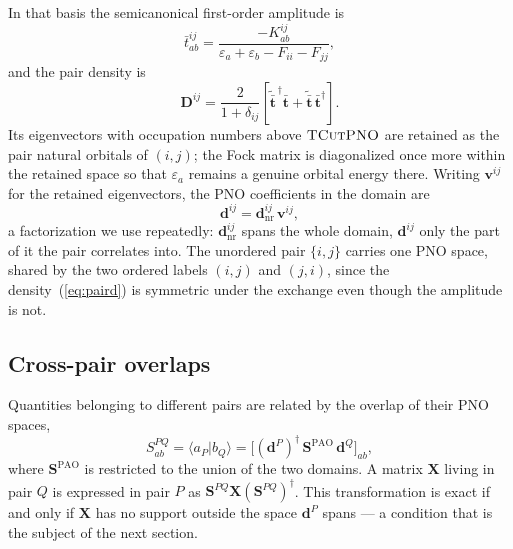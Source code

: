 \documentclass[aip,jcp,amsmath,amssymb,preprint,superscriptaddress]{revtex4-2}%
\newcommand{\TCut}[1]{\textsc{TCut#1}}
\begin{document}
In that basis the semicanonical first-order amplitude is
%
\begin{equation}
  \bar{t}^{ij}_{ab} = \frac{-K^{ij}_{ab}}
    {\varepsilon_a + \varepsilon_b - F_{ii} - F_{jj}},
  \label{eq:tsc}
\end{equation}
%
and the pair density is
%
\begin{equation}
  \mathbf{D}^{ij} = \frac{2}{1+\delta_{ij}}
    \left[ \tilde{\bar{\mathbf{t}}}^{\,\dagger}\bar{\mathbf{t}}
         + \tilde{\bar{\mathbf{t}}}\,\bar{\mathbf{t}}^{\dagger}\right].
  \label{eq:paird}
\end{equation}
%
Its eigenvectors with occupation numbers above $\TCut{PNO}$ are retained as
the pair natural orbitals of $(i,j)$; the Fock matrix is diagonalized once more
within the retained space so that $\varepsilon_a$ remains a genuine orbital
energy there. Writing $\mathbf{v}^{ij}$ for the retained eigenvectors, the PNO
coefficients in the domain are
%
\begin{equation}
  \mathbf{d}^{ij} = \mathbf{d}^{ij}_{\text{nr}}\,\mathbf{v}^{ij},
  \label{eq:dpno}
\end{equation}
%
a factorization we use repeatedly: $\mathbf{d}^{ij}_{\text{nr}}$ spans the
whole domain, $\mathbf{d}^{ij}$ only the part of it the pair correlates into.
The unordered pair $\{i,j\}$ carries one PNO space, shared by the two ordered
labels $(i,j)$ and $(j,i)$, since the density~(\ref{eq:paird}) is symmetric
under the exchange even though the amplitude is not.

\subsection{Cross-pair overlaps}

Quantities belonging to different pairs are related by the overlap of their
PNO spaces,
%
\begin{equation}
  S^{PQ}_{ab} = \big\langle a_P \big| b_Q \big\rangle
    = \big[(\mathbf{d}^{P})^{\dagger}\,\mathbf{S}^{\text{PAO}}\,
           \mathbf{d}^{Q}\big]_{ab},
  \label{eq:spq}
\end{equation}
%
where $\mathbf{S}^{\text{PAO}}$ is restricted to the union of the two domains.
A matrix $\mathbf{X}$ living in pair $Q$ is expressed in pair $P$ as
$\mathbf{S}^{PQ}\mathbf{X}(\mathbf{S}^{PQ})^{\dagger}$. This transformation is
exact if and only if $\mathbf{X}$ has no support outside the space
$\mathbf{d}^{P}$ spans --- a condition that is the subject of the next section.

\end{document}
